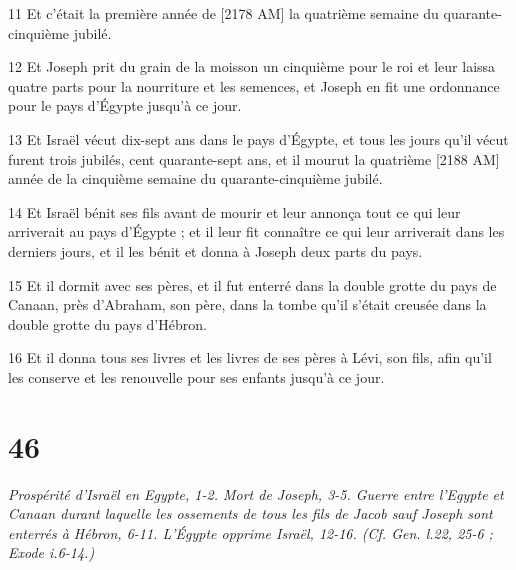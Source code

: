\par 11 Et c'était la première année de [2178 AM] la quatrième semaine du quarante-cinquième jubilé.
\par 12 Et Joseph prit du grain de la moisson un cinquième pour le roi et leur laissa quatre parts pour la nourriture et les semences, et Joseph en fit une ordonnance pour le pays d'Égypte jusqu'à ce jour.
\par 13 Et Israël vécut dix-sept ans dans le pays d'Égypte, et tous les jours qu'il vécut furent trois jubilés, cent quarante-sept ans, et il mourut la quatrième [2188 AM] année de la cinquième semaine du quarante-cinquième jubilé.
\par 14 Et Israël bénit ses fils avant de mourir et leur annonça tout ce qui leur arriverait au pays d'Égypte ; et il leur fit connaître ce qui leur arriverait dans les derniers jours, et il les bénit et donna à Joseph deux parts du pays.
\par 15 Et il dormit avec ses pères, et il fut enterré dans la double grotte du pays de Canaan, près d'Abraham, son père, dans la tombe qu'il s'était creusée dans la double grotte du pays d'Hébron.
\par 16 Et il donna tous ses livres et les livres de ses pères à Lévi, son fils, afin qu'il les conserve et les renouvelle pour ses enfants jusqu'à ce jour.

\chapter{46}

\par \textit{Prospérité d'Israël en Egypte, 1-2. Mort de Joseph, 3-5. Guerre entre l'Egypte et Canaan durant laquelle les ossements de tous les fils de Jacob sauf Joseph sont enterrés à Hébron, 6-11. L'Égypte opprime Israël, 12-16. (Cf. Gen. l.22, 25-6 ; Exode i.6-14.)}

